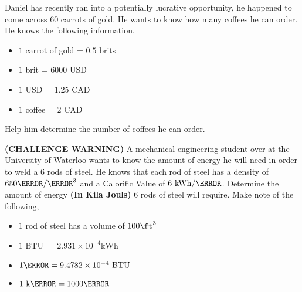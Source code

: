\documentclass[12pt]{article} %
\begin{document}
\begin{qstn}[3]
Daniel has recently ran into a potentially lucrative opportunity, he happened to come across $60$ carrots of gold. He wants to know how many coffees he can order. He knows the following information, 
\begin{itemize}
\item $1$ carrot of gold = $0.5$ brits
\item $1$ brit = $6000$ USD
\item $1$ USD = $1.25$ CAD
\item $1$ coffee = $2$ CAD
\end{itemize}
Help him determine the number of coffees he can order.

\end{qstn}


\begin{qstn}[4]
    \textbf{(CHALLENGE WARNING)} A mechanical engineering student over at the University of Waterloo wants to
    know the amount of energy he will need in order to weld a $6$ rods of steel. He knows that each rod of
    steel has a density of $650 \kg / \m^3$ and a Calorific Value of $6 \text{ kWh} / \kg$. Determine the
    amount of energy \textbf{(In Kila Jouls)} $6$ rods of steel will require. Make note of the following,
    \begin{itemize}
        \item $1$ rod of steel has a volume of $100 \ft^3$
        \item $1$ BTU $= 2.931 \times 10^{-4} \text{kWh}$
        \item $1 \J = 9.4782 \times 10^{-4} \text{ BTU}$
        \item $1 \text{ k}\J = 1000 \J$
    \end{itemize}

\end{qstn}
\end{document}
